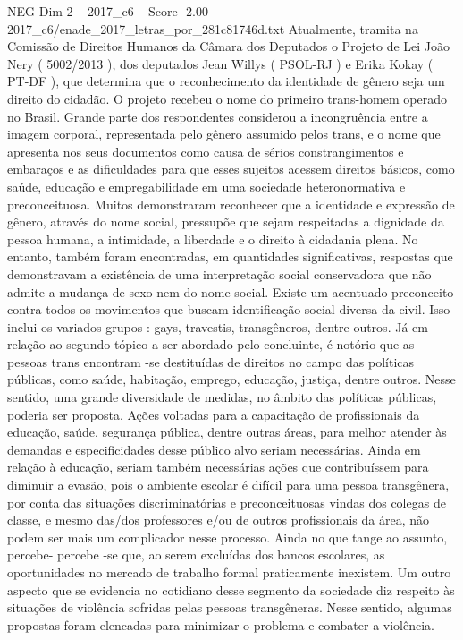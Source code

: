 \begin{textsample}{NEG Dim 2 – 2017\_c6 – Score -2.00 – 2017\_c6/enade\_2017\_letras\_por\_281c81746d.txt}
Atualmente, tramita na Comissão de Direitos Humanos da Câmara dos Deputados o Projeto de Lei João Nery ( 5002/2013 ), dos deputados Jean Willys ( PSOL-RJ ) e Erika Kokay ( PT-DF ), que determina que o reconhecimento da identidade de gênero seja um direito do cidadão.
O projeto recebeu o nome do primeiro trans-homem operado no Brasil.
Grande parte dos respondentes considerou a incongruência entre a imagem corporal, representada pelo gênero assumido pelos trans, e o nome que apresenta nos seus documentos como causa de sérios constrangimentos e embaraços e as dificuldades para que esses sujeitos acessem direitos básicos, como saúde, educação e empregabilidade em uma sociedade heteronormativa e preconceituosa.
Muitos demonstraram reconhecer que a identidade e expressão de gênero, através do nome social, pressupõe que sejam respeitadas a dignidade da pessoa humana, a intimidade, a liberdade e o direito à cidadania plena.
No entanto, também foram encontradas, em quantidades significativas, respostas que demonstravam a existência de uma interpretação social conservadora que não admite a mudança de sexo nem do nome social.
Existe um acentuado preconceito contra todos os movimentos que buscam identificação social diversa da civil.
Isso inclui os variados grupos : gays, travestis, transgêneros, dentre outros.
Já em relação ao segundo tópico a ser abordado pelo concluinte, é notório que as pessoas trans encontram -se destituídas de direitos no campo das políticas públicas, como saúde, habitação, emprego, educação, justiça, dentre outros.
Nesse sentido, uma grande diversidade de medidas, no âmbito das políticas públicas, poderia ser proposta.
Ações voltadas para a capacitação de profissionais da educação, saúde, segurança pública, dentre outras áreas, para melhor atender às demandas e especificidades desse público alvo seriam necessárias.
Ainda em relação à educação, seriam também necessárias ações que contribuíssem para diminuir a evasão, pois o ambiente escolar é difícil para uma pessoa transgênera, por conta das situações discriminatórias e preconceituosas vindas dos colegas de classe, e mesmo das/dos professores e/ou de outros profissionais da área, não podem ser mais um complicador nesse processo.
Ainda no que tange ao assunto, percebe- percebe -se que, ao serem excluídas dos bancos escolares, as oportunidades no mercado de trabalho formal praticamente inexistem.
Um outro aspecto que se evidencia no cotidiano desse segmento da sociedade diz respeito às situações de violência sofridas pelas pessoas transgêneras.
Nesse sentido, algumas propostas foram elencadas para minimizar o problema e combater a violência.

\end{textsample}
